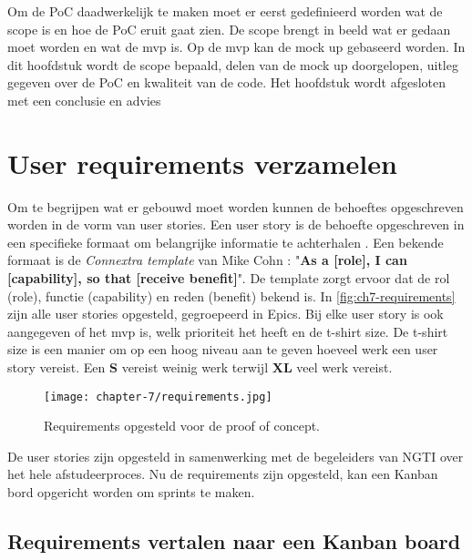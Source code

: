 Om de PoC daadwerkelijk te maken moet er eerst gedefinieerd worden wat de scope is en hoe de PoC eruit gaat zien. De scope brengt in beeld wat er gedaan moet worden en wat de \acrfull{mvp} is. Op de \acrshort{mvp} kan de mock up gebaseerd worden. In dit hoofdstuk wordt de scope bepaald, delen van de mock up doorgelopen, uitleg gegeven over de PoC en kwaliteit van de code. Het hoofdstuk wordt afgesloten met een conclusie en advies

\section{User requirements verzamelen}\label{sec:ch7-user-requirements-verzamelen}
Om te begrijpen wat er gebouwd moet worden kunnen de behoeftes opgeschreven worden in de vorm van user stories. Een user story is de behoefte opgeschreven in een specifieke formaat om belangrijke informatie te achterhalen \cite{agile-user-story-template}. Een bekende formaat is de \textit{Connextra template} van Mike Cohn \cite{agile-user-story-template}: "\textbf{As a [role], I can [capability], so that [receive benefit]}". De template zorgt ervoor dat de rol (role), functie (capability) en reden (benefit) bekend is. In \autoref{fig:ch7-requirements} zijn alle user stories opgesteld, gegroepeerd in Epics. Bij elke user story is ook aangegeven of het \acrshort{mvp} is, welk prioriteit het heeft en de t-shirt size. De t-shirt size is een manier om op een hoog niveau aan te geven hoeveel werk een user story vereist. Een \textbf{S} vereist weinig werk terwijl \textbf{XL} veel werk vereist.

\begin{figure}[hbt!]
  \centering
  \texttt{[image: chapter-7/requirements.jpg]}
  \caption{Requirements opgesteld voor de proof of concept.}
  \label{fig:ch7-requirements}
\end{figure}

De user stories zijn opgesteld in samenwerking met de begeleiders van NGTI over het hele afstudeerproces. Nu de requirements zijn opgesteld, kan een Kanban bord opgericht worden om sprints te maken.

\newpage

\subsection{Requirements vertalen naar een Kanban board}\label{subsec:ch7-requirements-vertalen-naar-een-kanban-board}

